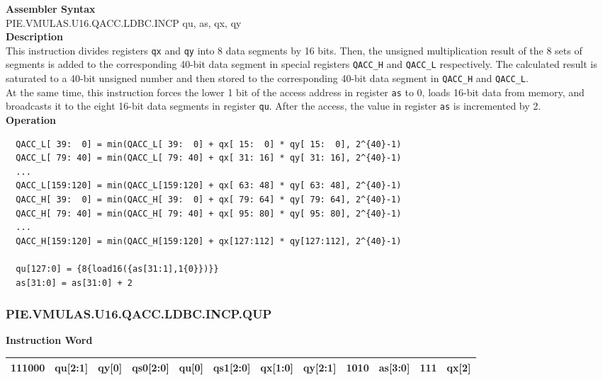 \textbf{Assembler Syntax} \\
PIE.VMULAS.U16.QACC.LDBC.INCP qu, as, qx, qy \\
\textbf{Description} \\
This instruction divides registers \lstinline{qx} and \lstinline{qy} into 8 data segments by 16 bits. Then, the unsigned multiplication result of the 8 sets of segments is added to the corresponding 40-bit data segment in special registers \lstinline{QACC_H} and \lstinline{QACC_L} respectively. The calculated result is saturated to a 40-bit unsigned number and then stored to the corresponding 40-bit data segment in \lstinline{QACC_H} and \lstinline{QACC_L}.\\
At the same time, this instruction forces the lower 1 bit of the access address in register \lstinline{as} to 0, loads 16-bit data from memory, and broadcasts it to the eight 16-bit data segments in register \lstinline{qu}. After the access, the value in register \lstinline{as} is incremented by 2.\\
\textbf{Operation}
\begin{lstlisting}
  QACC_L[ 39:  0] = min(QACC_L[ 39:  0] + qx[ 15:  0] * qy[ 15:  0], 2^{40}-1)
  QACC_L[ 79: 40] = min(QACC_L[ 79: 40] + qx[ 31: 16] * qy[ 31: 16], 2^{40}-1)
  ...
  QACC_L[159:120] = min(QACC_L[159:120] + qx[ 63: 48] * qy[ 63: 48], 2^{40}-1)
  QACC_H[ 39:  0] = min(QACC_H[ 39:  0] + qx[ 79: 64] * qy[ 79: 64], 2^{40}-1)
  QACC_H[ 79: 40] = min(QACC_H[ 79: 40] + qx[ 95: 80] * qy[ 95: 80], 2^{40}-1)
  ...
  QACC_H[159:120] = min(QACC_H[159:120] + qx[127:112] * qy[127:112], 2^{40}-1)

  qu[127:0] = {8{load16({as[31:1],1{0}})}}
  as[31:0] = as[31:0] + 2
\end{lstlisting}

\newpage
\subsubsection{PIE.VMULAS.U16.QACC.LDBC.INCP.QUP}\label{instruction:PIEVMULASU16QACCLDBCINCPQUP}
\setlength\tabcolsep{6pt}
\textbf{Instruction Word} \\
\begin{tabular}{|c|c|c|c|c|c|c|c|c|c|c|c|}
	\hline
	111000 & qu[2:1] & qy[0] & qs0[2:0] & qu[0] & qs1[2:0] & qx[1:0] & qy[2:1] & 1010 & as[3:0] & 111 & qx[2] \\
	\hline
\end{tabular}


